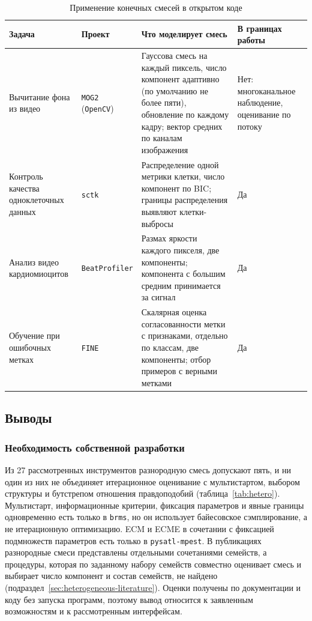 \begin{table}[!ht]
    \centering
    \small
    \renewcommand{\arraystretch}{1.2}
    \caption{Применение конечных смесей в открытом коде}\label{tab:code-examples}
    \begin{tabularx}{\textwidth}{@{}>{\raggedright\arraybackslash}p{}>{\raggedright\arraybackslash}p{}>{\raggedright\arraybackslash}X>{\raggedright\arraybackslash}p{}@{}}
        \toprule
        \textbf{Задача} & \textbf{Проект} & \textbf{Что моделирует смесь} & \textbf{В границах работы}\\
        \midrule
        Вычитание фона из видео & \texttt{MOG2} (\texttt{OpenCV}) & Гауссова смесь на каждый пиксель, число компонент адаптивно (по умолчанию не более пяти), обновление по каждому кадру; вектор средних по каналам изображения & Нет: многоканальное наблюдение, оценивание по потоку\\
        \addlinespace
        Контроль качества одноклеточных данных & \texttt{sctk} & Распределение одной метрики клетки, число компонент по BIC; границы распределения выявляют клетки-выбросы & Да\\
        \addlinespace
        Анализ видео кардиомиоцитов & \texttt{BeatProfiler} & Размах яркости каждого пикселя, две компоненты; компонента с большим средним принимается за сигнал & Да\\
        \addlinespace
        Обучение при ошибочных метках & \texttt{FINE} & Скалярная оценка согласованности метки с признаками, отдельно по классам, две компоненты; отбор примеров с верными метками & Да\\
        \bottomrule
    \end{tabularx}
\end{table}

\subsection{Выводы}
\label{sec:review-conclusions}

\subsubsection{Необходимость собственной разработки}

Из 27 рассмотренных инструментов разнородную смесь допускают пять, и ни один из них не объединяет итерационное оценивание с мультистартом, выбором структуры и бутстрепом отношения правдоподобий (таблица~\ref{tab:hetero}). Мультистарт, информационные критерии, фиксация параметров и явные границы одновременно есть только в \texttt{brms}, но он использует байесовское сэмплирование, а не итерационную оптимизацию. ECM и ECME в сочетании с фиксацией подмножеств параметров есть только в \texttt{pysatl-mpest}. В публикациях разнородные смеси представлены отдельными сочетаниями семейств, а процедуры, которая по заданному набору семейств совместно оценивает смесь и выбирает число компонент и состав семейств, не найдено (подраздел~\ref{sec:heterogeneous-literature}). Оценки получены по документации и коду без запуска программ, поэтому вывод относится к заявленным возможностям и к рассмотренным интерфейсам.

